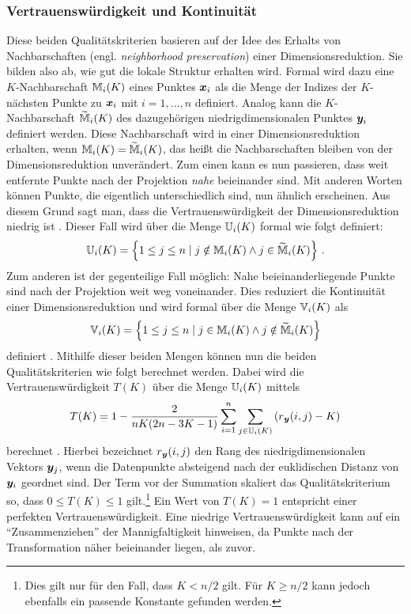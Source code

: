 \subsubsection{Vertrauenswürdigkeit und Kontinuität}
\label{ch:Vergleich:sec:Methodik:subsec:Qualitaetskriterien:TC}
Diese beiden Qualitätskriterien basieren auf der Idee des Erhalts von Nachbarschaften (engl.
\textit{neighborhood preservation}) einer Dimensionsreduktion. Sie bilden also ab, wie gut die
lokale Struktur erhalten wird. Formal wird dazu eine $K$-Nachbarschaft $\mathbb{M}_i(K)$ eines Punktes $\bm{x}_i$ als die Menge der Indizes der $K$-nächsten Punkte zu $\bm{x}_i$ mit $i = 1, \ldots, n$ definiert.
Analog kann die $K$-Nachbarschaft $\widetilde{\mathbb{M}}_i(K)$ des dazugehörigen niedrigdimensionalen
Punktes $\bm{y}_i$ definiert werden. Diese Nachbarschaft wird in einer Dimensionsreduktion
erhalten, wenn $\mathbb{M}_i(K) = \widetilde{\mathbb{M}}_i(K)$, das heißt die Nachbarschaften bleiben von
der Dimensionsreduktion unverändert. Zum einen kann es nun passieren, dass weit entfernte Punkte nach der Projektion \textit{nahe}
beieinander sind. Mit anderen Worten können Punkte, die eigentlich unterschiedlich sind, nun
ähnlich erscheinen. Aus diesem Grund sagt man, dass die Vertrauenswürdigkeit der
Dimensionsreduktion niedrig ist \parencite[486 -- 487]{Venna.2001}. Dieser Fall wird über die Menge $\mathbb{U}_i(K)$ formal wie folgt
definiert:
\begin{equation}
	\mathbb{U}_i(K) =  \left\{ 1 \leq j \leq n \mid j \notin \mathbb{M}_i(K) \land j \in \widetilde{\mathbb{M}}_i(K) \right\} \, .
\end{equation}
Zum anderen ist der gegenteilige Fall möglich: Nahe beieinanderliegende Punkte sind nach der
Projektion weit weg voneinander. Dies reduziert die Kontinuität einer Dimensionsreduktion und wird
formal über die Menge $\mathbb{V}_i(K)$ als
\begin{equation}
	\mathbb{V}_i(K) =  \left\{ 1 \leq j \leq n \mid j \in \mathbb{M}_i(K) \land j \notin \widetilde{\mathbb{M}}_i(K) \right\}
\end{equation}
definiert \parencite[487]{Venna.2001}. Mithilfe dieser beiden Mengen können nun die beiden Qualitätskriterien wie
folgt berechnet werden. Dabei wird die Vertrauenswürdigkeit $T(K)$ über die Menge $\mathbb{U}_i(K)$
mittels
\begin{equation}
	T(K) = 1 - \frac{2}{nK(2n - 3K - 1)} \sum_{i = 1}^{n}\sum_{j \in \set{U}_i(K) } \left( r­_{\vect{y}}(i, j) - K \right)
\end{equation}
berechnet \parencite[487]{Venna.2001}. Hierbei bezeichnet $r_{\bm{y}}(i, j)$ den Rang des niedrigdimensionalen
Vektors $\bm{y}_j$, wenn die Datenpunkte absteigend nach der euklidischen Distanz von
$\bm{y}_i$ geordnet sind. Der Term vor der Summation skaliert das Qualitätskriterium so, dass $0
	\leq T(K) \leq 1$ gilt.\footnote{Dies gilt nur für den Fall, dass $K < n/2$ gilt. Für $K \geq n/2$
	kann jedoch ebenfalls ein passende Konstante gefunden werden.} Ein Wert von $T(K) = 1­$ entspricht
einer perfekten Vertrauenswürdigkeit. Eine niedrige Vertrauenswürdigkeit kann auf ein
\enquote{Zusammenziehen} der Mannigfaltigkeit hinweisen, da Punkte nach der Transformation näher
beieinander liegen, als zuvor.

